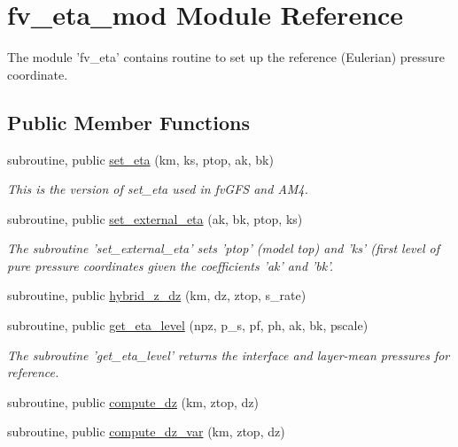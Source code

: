 \section{fv\-\_\-eta\-\_\-mod Module Reference}
\label{classfv__eta__mod}


The module 'fv\-\_\-eta' contains routine to set up the reference (Eulerian) pressure coordinate.  


\subsection*{Public Member Functions}
\begin{DoxyCompactItemize}
\item 
subroutine, public \hyperlink{classfv__eta__mod_a4a75f788fcb7401c0064bdb92d3b4953}{set\-\_\-eta} (km, ks, ptop, ak, bk)
\begin{DoxyCompactList}\small\item\em This is the version of set\-\_\-eta used in fv\-G\-F\-S and A\-M4. \end{DoxyCompactList}\item 
subroutine, public \hyperlink{classfv__eta__mod_a9bcd4fafe443993cdfbddbb177cfc033}{set\-\_\-external\-\_\-eta} (ak, bk, ptop, ks)
\begin{DoxyCompactList}\small\item\em The subroutine 'set\-\_\-external\-\_\-eta' sets 'ptop' (model top) and 'ks' (first level of pure pressure coordinates given the coefficients 'ak' and 'bk'. \end{DoxyCompactList}\item 
subroutine, public \hyperlink{classfv__eta__mod_a4e4105dac9b697433c572db3c7025f16}{hybrid\-\_\-z\-\_\-dz} (km, dz, ztop, s\-\_\-rate)
\item 
subroutine, public \hyperlink{classfv__eta__mod_ac666b63cee9afad18f2cf33dbced10f6}{get\-\_\-eta\-\_\-level} (npz, p\-\_\-s, pf, ph, ak, bk, pscale)
\begin{DoxyCompactList}\small\item\em The subroutine 'get\-\_\-eta\-\_\-level' returns the interface and layer-\/mean pressures for reference. \end{DoxyCompactList}\item 
subroutine, public \hyperlink{classfv__eta__mod_a2e39e6b09b9c0fa35603b30259dbf116}{compute\-\_\-dz} (km, ztop, dz)
\item 
subroutine, public \hyperlink{classfv__eta__mod_a1d0b3f206b0bfbdf5e3cf0d628a541cf}{compute\-\_\-dz\-\_\-var} (km, ztop, dz)

\end{DoxyCompactItemize}

